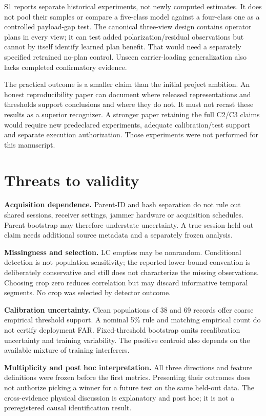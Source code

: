 \documentclass[
  10pt,
]{article}
\begin{document}
S1 reports separate historical experiments, not newly computed
estimates. It does not pool their samples or compare a five-class model
against a four-class one as a controlled payload-gap test. The canonical
three-view design contains operator plans in every view; it can test
added polarization/residual observations but cannot by itself identify
learned plan benefit. That would need a separately specified retrained
no-plan control. Unseen carrier-loading generalization also lacks
completed confirmatory evidence.

The practical outcome is a smaller claim than the initial project
ambition. An honest reproducibility paper can document where released
representations and thresholds support conclusions and where they do
not. It must not recast these results as a superior recognizer. A
stronger paper retaining the full C2/C3 claims would require new
predeclared experiments, adequate calibration/test support and separate
execution authorization. Those experiments were not performed for this
manuscript.

\section{Threats to validity}\label{threats-to-validity}

\textbf{Acquisition dependence.} Parent-ID and hash separation do not
rule out shared sessions, receiver settings, jammer hardware or
acquisition schedules. Parent bootstrap may therefore understate
uncertainty. A true session-held-out claim needs additional source
metadata and a separately frozen analysis.

\textbf{Missingness and selection.} LC empties may be nonrandom.
Conditional detection is not population sensitivity; the reported
lower-bound convention is deliberately conservative and still does not
characterize the missing observations. Choosing crop zero reduces
correlation but may discard informative temporal segments. No crop was
selected by detector outcome.

\textbf{Calibration uncertainty.} Clean populations of 38 and 69 records
offer coarse empirical threshold support. A nominal 5\% rule and
matching empirical count do not certify deployment FAR. Fixed-threshold
bootstrap omits recalibration uncertainty and training variability. The
positive centroid also depends on the available mixture of training
interferers.

\textbf{Multiplicity and post hoc interpretation.} All three directions
and feature definitions were frozen before the first metrics. Presenting
their outcomes does not authorize picking a winner for a future test on
the same held-out data. The cross-evidence physical discussion is
explanatory and post hoc; it is not a preregistered causal
identification result.
\end{document}
